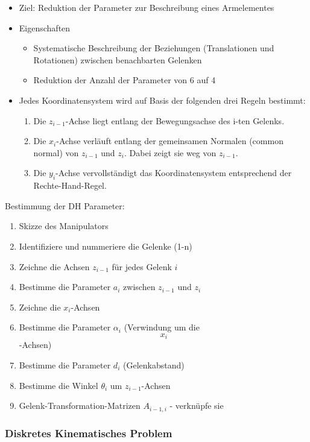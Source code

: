\documentclass[paper=a4, fontsize=11pt]{scrartcl} %
\numberwithin{equation}{section} %
\numberwithin{figure}{section} %
\numberwithin{table}{section} %
\begin{document}
\begin{itemize}
\item Ziel: Reduktion der Parameter zur Beschreibung eines Armelementes
\item Eigenschaften
\begin{itemize}
\item Systematische Beschreibung der Beziehungen (Translationen und Rotationen) zwischen benachbarten Gelenken
\item Reduktion der Anzahl der Parameter von 6 auf 4
\end{itemize}
\item Jedes Koordinatensystem wird auf Basis der folgenden drei Regeln bestimmt:
\begin{enumerate}
\item Die $z_{i-1}$-Achse liegt entlang der Bewegungsachse des i-ten Gelenks.
\item Die $x_i$-Achse verläuft entlang der gemeinsamen Normalen (common normal) von $z_{i-1}$ und $z_i$. Dabei zeigt sie weg von $z_{i-1}$.
\item Die $y_i$-Achse vervollständigt das Koordinatensystem entsprechend der Rechte-Hand-Regel.
\end{enumerate}
\end{itemize}

Bestimmung der DH Parameter:
\begin{enumerate}
\item Skizze des Manipulators
\item Identifiziere und nummeriere die Gelenke (1-n)
\item Zeichne die Achsen $z_{i-1}$ für jedes Gelenk $i$
\item Bestimme die Parameter $a_i$ zwischen $z_{i-1}$ und $z_i$
\item Zeichne die $x_i$-Achsen
\item Bestimme die Parameter $\alpha_i$ (Verwindung um die $$x_i$$-Achsen)
\item Bestimme die Parameter $d_i$ (Gelenkabstand)
\item Bestimme die Winkel $\theta_i$ um $z_{i-1}$-Achsen
\item Gelenk-Transformation-Matrizen $A_{i-1,i}$ - verknüpfe sie
\end{enumerate}

\subsubsection{Diskretes Kinematisches Problem}
\end{document}
